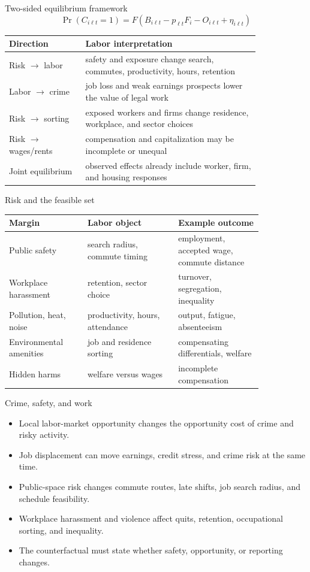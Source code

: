 \documentclass[aspectratio=169,11pt]{beamer}
\begin{document}
\begin{frame}{Two-sided equilibrium framework}
\[
\Pr(C_{i\ell t}=1)
=
F\left(B_{i\ell t}-p_{\ell t}F_i-O_{i\ell t}+\eta_{i\ell t}\right)
\]
\small
\begin{tabular}{p{0.25\linewidth} p{0.58\linewidth}}
\toprule
Direction & Labor interpretation \\
\midrule
Risk $\rightarrow$ labor & safety and exposure change search, commutes, productivity, hours, retention \\
Labor $\rightarrow$ crime & job loss and weak earnings prospects lower the value of legal work \\
Risk $\rightarrow$ sorting & exposed workers and firms change residence, workplace, and sector choices \\
Risk $\rightarrow$ wages/rents & compensation and capitalization may be incomplete or unequal \\
Joint equilibrium & observed effects already include worker, firm, and housing responses \\
\bottomrule
\end{tabular}
\end{frame}

\begin{frame}{Risk and the feasible set}
\small
\begin{tabular}{p{0.26\linewidth} p{0.30\linewidth} p{0.28\linewidth}}
\toprule
Margin & Labor object & Example outcome \\
\midrule
Public safety & search radius, commute timing & employment, accepted wage, commute distance \\
Workplace harassment & retention, sector choice & turnover, segregation, inequality \\
Pollution, heat, noise & productivity, hours, attendance & output, fatigue, absenteeism \\
Environmental amenities & job and residence sorting & compensating differentials, welfare \\
Hidden harms & welfare versus wages & incomplete compensation \\
\bottomrule
\end{tabular}
\end{frame}

\begin{frame}{Crime, safety, and work}
\begin{itemize}
    \item Local labor-market opportunity changes the opportunity cost of crime and risky activity.
    \item Job displacement can move earnings, credit stress, and crime risk at the same time.
    \item Public-space risk changes commute routes, late shifts, job search radius, and schedule feasibility.
    \item Workplace harassment and violence affect quits, retention, occupational sorting, and inequality.
    \item The counterfactual must state whether safety, opportunity, or reporting changes.
\end{itemize}
\end{frame}
\end{document}
